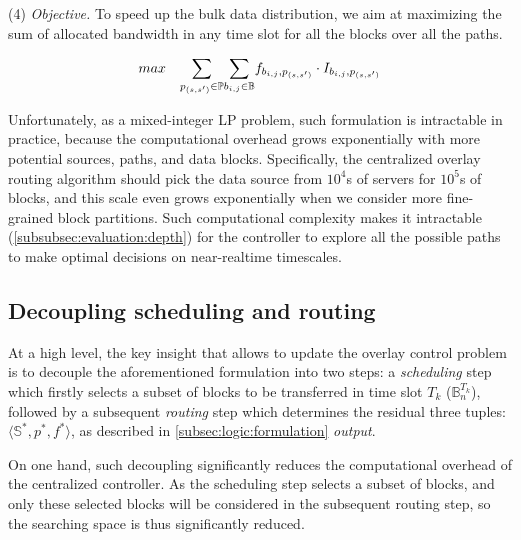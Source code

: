 \noindent(4) {\em Objective.} To speed up the bulk data distribution, we aim at maximizing the sum of allocated bandwidth in any time slot for all the blocks over all the paths.

\begin{equation}
\centering
max \quad \displaystyle{\sum_{p_{(s,s')}\in \mathbb{P}}} \displaystyle{\sum_{b_{i,j} \in \mathbb{B}}} f_{b_{i,j},p_{(s,s')}} \cdot I_{b_{i,j},p_{(s,s')}}
\label{equation:objective}
\end{equation}

Unfortunately, as a mixed-integer LP problem, such formulation is intractable in practice, because the computational overhead grows exponentially with more potential sources, paths, and data blocks. Specifically, the centralized overlay routing algorithm should pick the data source from $10^4$s of servers for $10^5$s of blocks, and this scale even grows exponentially when we consider more fine-grained block partitions. Such computational complexity makes it intractable (\Section\ref{subsubsec:evaluation:depth}) for the controller to explore all the possible paths to make optimal decisions on near-realtime timescales.


\subsection{Decoupling scheduling and routing}
\label{subsec:logic:separation}

At a high level, the key insight that allows \name to update the overlay control problem is
to decouple the aforementioned formulation into two steps:
a {\em scheduling} step which firstly selects a subset of blocks to be transferred in time slot $T_k$
($\mathbb{B}^{T_k}_n$), followed by a subsequent {\em routing}
step which determines the residual three tuples: $\langle \mathbb{S}^*, p^*, f^* \rangle$, as described in \Section\ref{subsec:logic:formulation} {\em output}.

On one hand, such decoupling significantly reduces the computational overhead of the centralized controller. As the scheduling step selects a subset of blocks, and only these selected blocks will be considered in the subsequent routing step, so the searching space is thus significantly reduced.

